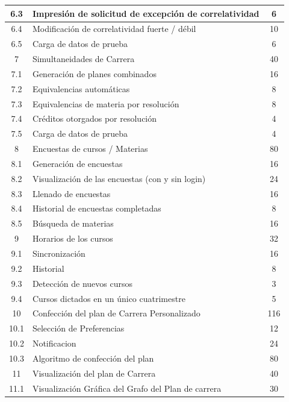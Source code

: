 \documentclass[a4paper]{article}
\begin{document}
\begin{longtable}{| c | l | c |}
\hline
6.3					&	Impresión de solicitud de excepción de correlatividad			&	6\\
\hline
6.4					&	Modificación de correlatividad fuerte / débil					&	10\\
\hline
6.5					&	Carga de datos de prueba										&	6\\
\hline
7					&	Simultaneidades de Carrera										&	40\\
\hline
7.1					&	Generación de planes combinados								&	16\\
\hline
7.2					&	Equivalencias automáticas										&	8\\
\hline
7.3					&	Equivalencias de materia por resolución						&	8\\
\hline
7.4					&	Créditos otorgados por resolución								&	4\\
\hline
7.5					&	Carga de datos de prueba										&	4\\
\hline
8					&	Encuestas de cursos / Materias									&	80\\
\hline
8.1					&	Generación de encuestas											&	16\\
\hline
8.2					&	Visualización de las encuestas (con y sin login)				&	24\\
\hline
8.3					&	Llenado de encuestas											&	16\\
\hline
8.4					&	Historial de encuestas completadas								&	8\\
\hline
8.5					&	Búsqueda de materias											&	16\\
\hline
9					&	Horarios de los cursos											&	32\\
\hline
9.1					&	Sincronización													&	16\\
\hline
9.2					&	Historial														&	8\\
\hline
9.3					&	Detección de nuevos cursos										&	3\\
\hline
9.4					&	Cursos dictados en un único cuatrimestre						&	5\\
\hline
10					&	Confección del plan de Carrera Personalizado					&	116\\
\hline
10.1				&	Selección de Preferencias										&	12\\
\hline
10.2				&	Notificacion													&	24\\
\hline
10.3				&	Algoritmo de confección del plan								&	80\\
\hline
11					&	Visualización del plan de Carrera								&	40\\
\hline
11.1				&	Visualización Gráfica del Grafo del Plan de carrera			&	30\\

\end{longtable}
\end{document}
